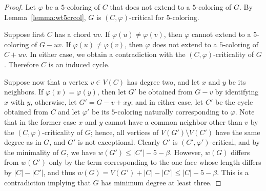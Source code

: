 \documentclass[12pt,twoside,openright,a4paper]{book}
\begin{document}
\begin{proof}
Let $\varphi$ be a $5$-coloring of $C$ that does not extend to a $5$-coloring of $G$.
By Lemma~\ref{lemma:wt5crcol}, $G$ is $(C,\varphi)$-critical for $5$-coloring.

Suppose first $C$ has a chord $uv$.  If $\varphi(u)\neq\varphi(v)$, then $\varphi$
cannot extend to a $5$-coloring of $G-uv$.  If $\varphi(u)\neq\varphi(v)$, then $\varphi$
does not extend to a $5$-coloring of $C+uv$.  In either case, we obtain a contradiction
with the $(C,\varphi)$-criticality of $G$.  Therefore $C$ is an induced cycle.

Suppose now that a vertex $v\in V(C)$ has degree two, and let $x$ and $y$ be its neighbors.
If $\varphi(x)=\varphi(y)$, then let $G'$ be obtained from $G-v$ by identifying $x$ with $y$,
otherwise, let $G'=G-v+xy$; and in either case, let $C'$ be the cycle obtained from $C$ and
let $\varphi'$ be its $5$-coloring naturally corresponding to $\varphi$.  Note that in the former
case $x$ and $y$ cannot have a common neighbor other than $v$ by the $(C,\varphi)$-criticality of $G$;
hence, all vertices of $V(G')\setminus V(C')$ have the same degree as in $G$, and $G'$ is not exceptional.
Clearly $G'$ is $(C',\varphi')$-critical, and by the minimality of $G$, we have $w(G')\le |C'|-5-\beta$.
However, $w(G)$ differs from $w(G')$ only by the term corresponding to the one face whose length differs by
$|C|-|C'|$, and thus $w(G)=V(G')+|C|-|C'|\le |C|-5-\beta$.  This is a contradiction implying that $G$ has minimum
degree at least three.


\end{proof}
\end{document}
